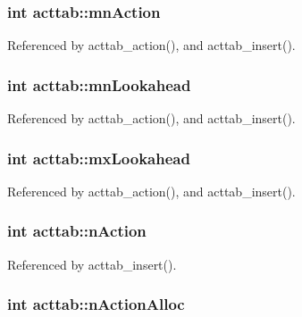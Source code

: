 \hypertarget{structacttab_a034d4761f4a67e49860504e4355cc37b}{
\subsubsection[{mn\-Action}]{\setlength{\rightskip}{0pt plus 5cm}int acttab\-::mn\-Action}}\label{structacttab_a034d4761f4a67e49860504e4355cc37b}


Referenced by acttab\-\_\-action(), and acttab\-\_\-insert().

\hypertarget{structacttab_a0d7b48695b227d3b48e6fe61f2dcf41c}{
\subsubsection[{mn\-Lookahead}]{\setlength{\rightskip}{0pt plus 5cm}int acttab\-::mn\-Lookahead}}\label{structacttab_a0d7b48695b227d3b48e6fe61f2dcf41c}


Referenced by acttab\-\_\-action(), and acttab\-\_\-insert().

\hypertarget{structacttab_a466d035d73cff7999cbb4c3a1b8c763d}{
\subsubsection[{mx\-Lookahead}]{\setlength{\rightskip}{0pt plus 5cm}int acttab\-::mx\-Lookahead}}\label{structacttab_a466d035d73cff7999cbb4c3a1b8c763d}


Referenced by acttab\-\_\-action(), and acttab\-\_\-insert().

\hypertarget{structacttab_a8f1f0a4b91e02ffe3b978f0c7d5715f2}{
\subsubsection[{n\-Action}]{\setlength{\rightskip}{0pt plus 5cm}int acttab\-::n\-Action}}\label{structacttab_a8f1f0a4b91e02ffe3b978f0c7d5715f2}


Referenced by acttab\-\_\-insert().

\hypertarget{structacttab_a4836bf372ea8e78c0ff0cc23d7331330}{
\subsubsection[{n\-Action\-Alloc}]{\setlength{\rightskip}{0pt plus 5cm}int acttab\-::n\-Action\-Alloc}}\label{structacttab_a4836bf372ea8e78c0ff0cc23d7331330}


